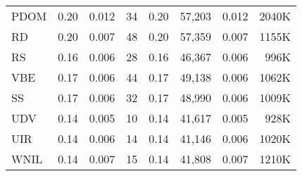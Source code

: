 \begin{table}
\begin{tabular}{rrrrrrrr}
\multicolumn{1}{l}{PDOM} & 0.20 &    0.012   &       34  &   0.20    &   57,203    &   0.012    &  2040K\\
\multicolumn{1}{l}{RD} & 0.20 &   0.007    &       48  &    0.20   &   57,359    &  0.007     &  1155K\\
\multicolumn{1}{l}{RS} & 0.16 &   0.006    &       28  &   0.16    &   46,367    &   0.006    &  996K\\
\multicolumn{1}{l}{VBE} & 0.17 &  0.006     &       44  &   0.17    &   49,138    &   0.006    &  1062K\\
\multicolumn{1}{l}{SS} & 0.17 &  0.006     &       32  &   0.17    &   48,990    &   0.006    &  1009K\\
\multicolumn{1}{l}{UDV} & 0.14 &  0.005     &       10  &    0.14   &  41,617     &  0.005     &  928K\\
\multicolumn{1}{l}{UIR} & 0.14 &   0.006    &       14  &   0.14    &   41,146    &   0.006    &  1020K\\
\multicolumn{1}{l}{WNIL} & 0.14 &   0.007    &       15  &   0.14    &  41,808     &  0.007     &  1210K\\
\bottomrule
\end{tabular}%

	\label{tab:time}%
\end{table}%

